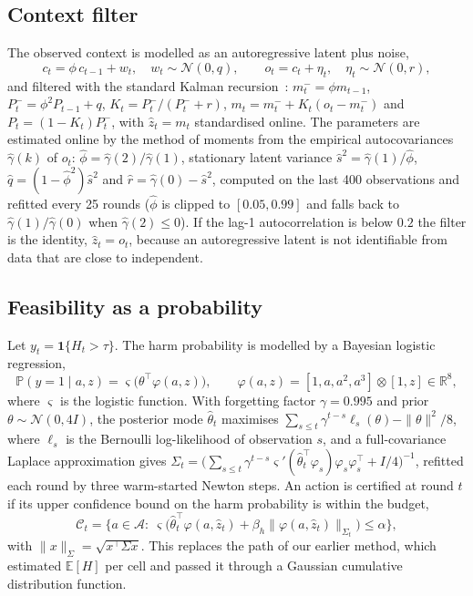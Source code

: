 \documentclass[10pt,a4paper]{article}
\begin{document}
\subsection*{Context filter}
The observed context is modelled as an autoregressive latent plus noise,
\begin{equation}
c_t=\phi\,c_{t-1}+w_t,\quad w_t\sim\mathcal N(0,q),\qquad o_t=c_t+\eta_t,\quad\eta_t\sim\mathcal N(0,r),
\label{eq:ar1}
\end{equation}
and filtered with the standard Kalman recursion~\cite{kalman1960}: $m_t^-=\phi m_{t-1}$,
$P_t^-=\phi^2P_{t-1}+q$, $K_t=P_t^-/(P_t^-+r)$, $m_t=m_t^-+K_t(o_t-m_t^-)$ and $P_t=(1-K_t)P_t^-$,
with $\hat z_t=m_t$ standardised online. The parameters are estimated online by the method of moments
from the empirical autocovariances $\hat\gamma(k)$ of $o_t$:
$\hat\phi=\hat\gamma(2)/\hat\gamma(1)$, stationary latent variance $\hat s^2=\hat\gamma(1)/\hat\phi$,
$\hat q=(1-\hat\phi^2)\hat s^2$ and $\hat r=\hat\gamma(0)-\hat s^2$, computed on the last 400 observations and refitted every 25 rounds ($\hat\phi$ is clipped to $[0.05,0.99]$ and falls back to $\hat\gamma(1)/\hat\gamma(0)$ when $\hat\gamma(2)\le0$). If the lag-1
autocorrelation is below $0.2$ the filter is the identity, $\hat z_t=o_t$, because an autoregressive
latent is not identifiable from data that are close to independent.

\subsection*{Feasibility as a probability}
Let $y_t=\mathbf 1\{H_t>\tau\}$. The harm probability is modelled by a Bayesian logistic regression,
\begin{equation}
\mathbb P(y=1\mid a,z)=\varsigma\big(\theta^\top\varphi(a,z)\big),\qquad
\varphi(a,z)=[1,a,a^2,a^3]\otimes[1,z]\in\mathbb R^8,
\label{eq:glm}
\end{equation}
where $\varsigma$ is the logistic function. With forgetting factor $\gamma=0.995$ and prior
$\theta\sim\mathcal N(0,4I)$, the posterior mode $\hat\theta_t$ maximises
$\sum_{s\le t}\gamma^{t-s}\ell_s(\theta)-\|\theta\|^2/8$, where $\ell_s$ is the Bernoulli
log-likelihood of observation $s$, and a full-covariance Laplace approximation gives
$\Sigma_t=\big(\sum_{s\le t}\gamma^{t-s}\varsigma'(\hat\theta_t^\top\varphi_s)\varphi_s\varphi_s^\top+I/4\big)^{-1}$, refitted each round by three warm-started Newton steps. An action is certified at round $t$ if its upper
confidence bound on the harm probability is within the budget,
\begin{equation}
\mathcal C_t=\Big\{a\in\mathcal A:\ \varsigma\big(\hat\theta_t^\top\varphi(a,\hat z_t)+\beta_h\|\varphi(a,\hat z_t)\|_{\Sigma_t}\big)\le\alpha\Big\},
\label{eq:cert}
\end{equation}
with $\|x\|_\Sigma=\sqrt{x^\top\Sigma x}$. This replaces the path of our earlier method, which estimated
$\mathbb E[H]$ per cell and passed it through a Gaussian cumulative distribution function.
\end{document}
